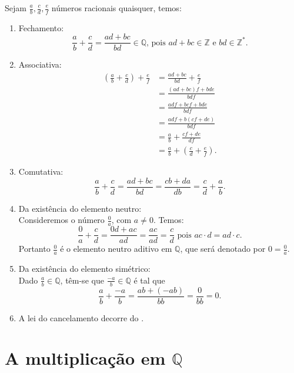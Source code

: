 \documentclass[../main.tex]{subfiles}
\begin{document}
\begin{dem}
    Sejam $\frac{a}{b}, \frac{c}{d}, \frac{e}{f}$ números racionais quaisquer, temos:
    \begin{enumerate}[label=(\roman*)]
        \item Fechamento: \\
        \[ \frac{a}{b}+ \frac{c}{d} = \frac{ad+bc}{bd} \in \mathbb{Q} \text{, pois }ad+bc \in \mathbb{Z}\text{ e }bd \in \mathbb{Z}^*. \]
        \item Associativa: \\
        \begin{align*}
            \left( \frac{a}{b} + \frac{c}{d} \right) + \frac{e}{f} 
            &= \frac{ad+bc}{bd} + \frac{e}{f} \\
            &= \frac{(ad+bc)f + bde}{bdf} \\
            &= \frac{adf + bcf + bde}{bdf} \\
            &= \frac{adf+b(cf+de)}{bdf} \\
            &= \frac{a}{b} + \frac{cf+de}{df} \\
            &= \frac{a}{b} + \left( \frac{c}{d} + \frac{e}{f} \right).
        \end{align*}
        
        \item Comutativa:
        \[ \frac{a}{b} + \frac{c}{d} = \frac{ad+bc}{bd} = \frac{cb + da}{db} = \frac{c}{d} + \frac{a}{b}. \]
        \item Da existência do elemento neutro: \\ 
        Consideremos o número $\frac{0}{a}$, com $a \neq 0$. Temos:
        \[ \frac{0}{a} + \frac{c}{d} = \frac{0d+ac}{ad} = \frac{ac}{ad} = \frac{c}{d} \text{ pois } ac \cdot d = ad \cdot c.\]
        Portanto $\frac{0}{a}$ é o elemento neutro aditivo em $\mathbb{Q}$, que será denotado por $0 = \frac{0}{a}$.
        \item Da existência do elemento simétrico: \\
        Dado $\frac{a}{b} \in \mathbb{Q}$, têm-se que $\frac{-a}{b} \in \mathbb{Q}$ é tal que
        \[ \frac{a}{b} + \frac{-a}{b} = \frac{ab + (-ab)}{bb} = \frac{0}{bb} = 0.\]
        \item A  lei do cancelamento decorre do .
    \end{enumerate}
\end{dem}


\section{A multiplicação em $\mathbb{Q}$}
\end{document}
